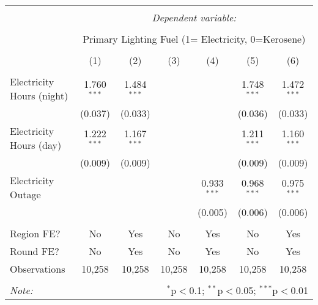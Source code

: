 
\begin{tabular}{@{\extracolsep{5pt}}lcccccc} 
\\[-1.8ex]\hline 
\hline \\[-1.8ex] 
 & \multicolumn{6}{c}{\textit{Dependent variable:}} \\ 
\cline{2-7} 
\\[-1.8ex] & \multicolumn{6}{c}{Primary Lighting Fuel (1= Electricity, 0=Kerosene)} \\ 
\\[-1.8ex] & (1) & (2) & (3) & (4) & (5) & (6)\\ 
\hline \\[-1.8ex] 
 Electricity Hours (night) & 1.760$^{***}$ & 1.484$^{***}$ &  &  & 1.748$^{***}$ & 1.472$^{***}$ \\ 
  & (0.037) & (0.033) &  &  & (0.036) & (0.033) \\ 
  Electricity Hours (day) & 1.222$^{***}$ & 1.167$^{***}$ &  &  & 1.211$^{***}$ & 1.160$^{***}$ \\ 
  & (0.009) & (0.009) &  &  & (0.009) & (0.009) \\ 
  Electricity Outage &  &  &  & 0.933$^{***}$ & 0.968$^{***}$ & 0.975$^{***}$ \\ 
  &  &  &  & (0.005) & (0.006) & (0.006) \\ 
 \hline \\[-1.8ex] 
Region FE? & No & Yes & No & Yes & No & Yes \\ 
Round FE? & No & Yes & No & Yes & No & Yes \\ 
Observations & 10,258 & 10,258 & 10,258 & 10,258 & 10,258 & 10,258 \\ 
\hline 
\hline \\[-1.8ex] 
\textit{Note:}  & \multicolumn{6}{r}{$^{*}$p$<$0.1; $^{**}$p$<$0.05; $^{***}$p$<$0.01} \\ 
\end{tabular} 
